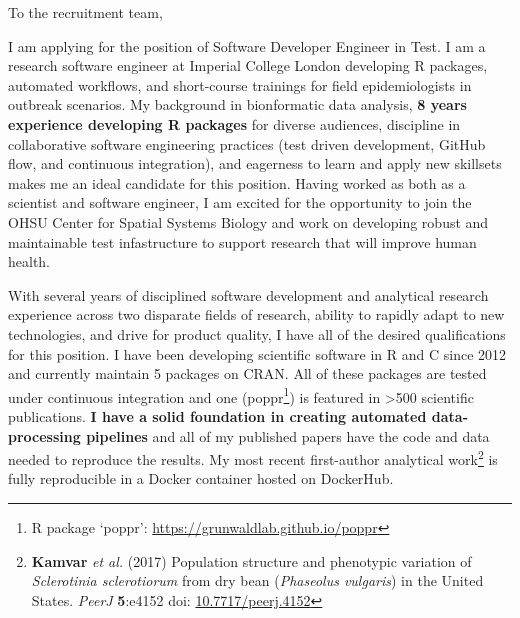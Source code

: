


\vspace{1ex}
To the recruitment team,

\vspace{1ex}

I am applying for the position of Software Developer Engineer in Test. I am a
research software engineer at Imperial College London developing R packages,
automated workflows, and short-course trainings for field epidemiologists in
outbreak scenarios. My background in bionformatic data analysis, \textbf{8
years experience developing R packages} for diverse audiences, discipline in
collaborative software engineering practices (test driven development, GitHub
flow, and continuous integration), and eagerness to learn and apply new
skillsets makes me an ideal candidate for this position. Having worked as both
as a scientist and software engineer, I am excited for the opportunity to join
the OHSU Center for Spatial Systems Biology and work on developing robust and
maintainable test infastructure to support research that will improve human 
health. 


\vspace{1ex}

With several years of disciplined software development and analytical
research experience across two disparate fields of research, ability to rapidly
adapt to new technologies, and drive for product quality, I have all of the
desired qualifications for this position. I have been developing scientific
software in R and C since 2012 and currently maintain 5 packages on CRAN. All
of these packages are tested under continuous integration and one
(poppr\footnote{R package `poppr': \url{https://grunwaldlab.github.io/poppr}})
is featured in \textgreater500 scientific publications. \textbf{I have a solid
foundation in creating automated data-processing pipelines} and all of my
published papers have the code and data needed to reproduce the results. My
most recent first-author analytical work\footnote{\textbf{Kamvar} \textit{et al.} (2017) Population structure and
phenotypic variation of \textit{Sclerotinia sclerotiorum} from dry bean
(\textit{Phaseolus vulgaris}) in the United States. \textit{PeerJ}
\textbf{5}:e4152 doi:
\href{https://doi.org/10.7717/peerj.4152}{10.7717/peerj.4152}} is fully
reproducible in a Docker container hosted on DockerHub.


